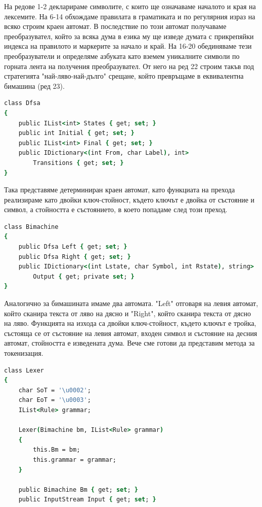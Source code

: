 \documentclass[12pt, oneside]{article}
\theoremstyle{definition}
\begin{document}
На редове 1-2 декларираме символите, с които ще означаваме началото и края на лексемите. На 6-14 обхождаме правилата в граматиката и по регулярния израз на всяко строим краен автомат. В последствие по този автомат получаваме преобразувател, който за всяка дума в езика му ще изведе думата с прикрепяйки индекса на правилото и маркерите за начало и край. На 16-20 обединяваме тези преобразуватели и определяме азбуката като вземем уникалните символи по горната лента на получения преобразувател. От него на ред 22 строим такъв под стратегията "най-ляво-най-дълго" срещане, който превръщаме в еквивалентна бимашина (ред 23). 

\begin{lstlisting}[language=csh]
class Dfsa
{
    public IList<int> States { get; set; }
    public int Initial { get; set; }
    public IList<int> Final { get; set; }
    public IDictionary<(int From, char Label), int> 
        Transitions { get; set; }
}
\end{lstlisting}

Така представяме детерминиран краен автомат, като функциата на прехода реализираме като двойки ключ-стойност, където ключът е двойка от състояние и символ, а стойността е състоянието, в което попадаме след този преход.

\begin{lstlisting}[language=csh]
class Bimachine
{
    public Dfsa Left { get; set; }
    public Dfsa Right { get; set; }
    public IDictionary<(int Lstate, char Symbol, int Rstate), string> 
        Output { get; private set; }
}
\end{lstlisting}

Аналогично за бимашината имаме два автомата. "Left" отговаря на левия автомат, който сканира текста от ляво на дясно и "Right", който сканира текста от дясно на ляво. Функцията на изхода са двойки ключ-стойност, където ключът е тройка, състояща се от състояние на левия автомат, входен символ и състояние на десния автомат, стойността е изведената дума. Вече сме готови да представим метода за токенизация.

\begin{lstlisting}[language=csh]
class Lexer
{
    char SoT = '\u0002';
    char EoT = '\u0003';
    IList<Rule> grammar;

    Lexer(Bimachine bm, IList<Rule> grammar)
    {
        this.Bm = bm;
        this.grammar = grammar;
    }

    public Bimachine Bm { get; set; }
    public InputStream Input { get; set; }
\end{lstlisting}
\end{document}
